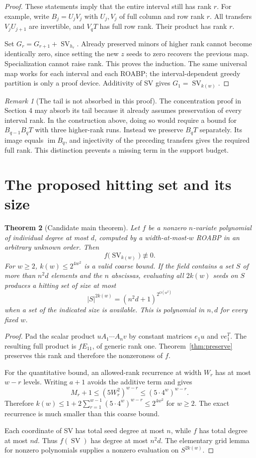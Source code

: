 \documentclass[11pt]{article}
\newtheorem{theorem}{Theorem}[section]
\theoremstyle{definition}\newtheorem{definition}[theorem]{Definition}
\theoremstyle{remark}\newtheorem{remark}[theorem]{Remark}
\newcommand{\im}{\operatorname{im}}
\newcommand{\SV}{\operatorname{SV}}
\begin{document}
\begin{proof}
These statements imply that the entire interval still has rank $r$.
For example, write $B_j=U_jV_j$ with $U_j,V_j$ of full column and row
rank $r$. All transfers $V_jU_{j+1}$ are invertible, and $V_qT$ has full
row rank. Their product has rank $r$.

Set $G_r=G_{r+1}+\SV_{h_r}$. Already preserved minors of higher rank
cannot become identically zero, since setting the new $z$ seeds to zero
recovers the previous map. Specialization cannot raise rank. This proves
the induction. The same universal map works for each interval and each
ROABP; the interval-dependent greedy partition is only a proof device.
Additivity of SV gives $G_1=\SV_{k(w)}$.
\end{proof}

\begin{remark}[The tail is not absorbed in this proof]
The concentration proof in Section 4 may absorb its tail because it
already assumes preservation of every interval rank. In the construction
above, doing so would require a bound for $B_{q-1}B_qT$ with three
higher-rank runs. Instead we preserve $B_qT$ separately. Its image equals
$\im B_q$, and injectivity of the preceding transfers gives the required
full rank. This distinction prevents a missing term in the support budget.
\end{remark}

\section{The proposed hitting set and its size}

\begin{theorem}[Candidate main theorem]\label{thm:main}
Let $f$ be a nonzero $n$-variate polynomial of individual degree at most
$d$, computed by a width-at-most-$w$ ROABP in an arbitrary unknown order.
Then
\[
 f\bigl(\SV_{k(w)}\bigr)\not\equiv0.
\]
For $w\ge2$, $k(w)\le2^{4w^2}$ is a valid coarse bound. If the field
contains a set $S$ of more than $n^2d$ elements and the $n$ abscissas,
evaluating all $2k(w)$ seeds on $S$ produces a hitting set of size at most
\[
 |S|^{2k(w)}=(n^2d+1)^{2^{O(w^2)}}
\]
when a set of the indicated size is available. This is polynomial in
$n,d$ for every fixed $w$.
\end{theorem}
\begin{proof}
Pad the scalar product $uA_1\cdots A_nv$ by constant matrices
$e_1u$ and $ve_1^T$. The resulting full product is $fE_{11}$, of generic
rank one. Theorem~\ref{thm:preserve} preserves this rank and therefore
the nonzeroness of $f$.

For the quantitative bound, an allowed-rank recurrence at width $W_r$
has at most $w-r$ levels. Writing $a+1$ avoids the additive term and gives
\[
 M_r+1\le(5W_r^2)^{w-r}\le(5\cdot4^w)^{w-r}.
\]
Therefore $k(w)\le1+2\sum_{r=1}^{w-1}(5\cdot4^w)^{w-r}\le2^{4w^2}$
for $w\ge2$. The exact recurrence is much smaller than this coarse bound.

Each coordinate of SV has total seed degree at most $n$, while $f$ has
total degree at most $nd$. Thus $f(\SV)$ has degree at most $n^2d$.
The elementary grid lemma for nonzero polynomials supplies a nonzero
evaluation on $S^{2k(w)}$.
\end{proof}
\end{document}

